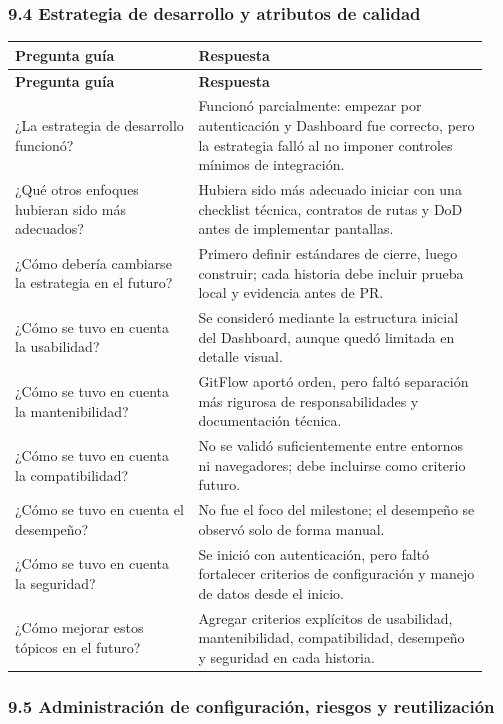 \documentclass[11pt,a4paper]{article}
\begin{document}
\subsubsection{9.4 Estrategia de desarrollo y atributos de calidad}

\begingroup
\small
\setlength{\tabcolsep}{3pt}
\begin{longtable}{P{0.36\linewidth}P{0.58\linewidth}}
\toprule
\textbf{Pregunta guía} & \textbf{Respuesta} \\
\midrule
\endfirsthead
\toprule
\textbf{Pregunta guía} & \textbf{Respuesta} \\
\midrule
\endhead
\bottomrule
\endlastfoot
¿La estrategia de desarrollo funcionó? & Funcionó parcialmente: empezar por autenticación y Dashboard fue correcto, pero la estrategia falló al no imponer controles mínimos de integración. \\
¿Qué otros enfoques hubieran sido más adecuados? & Hubiera sido más adecuado iniciar con una checklist técnica, contratos de rutas y DoD antes de implementar pantallas. \\
¿Cómo debería cambiarse la estrategia en el futuro? & Primero definir estándares de cierre, luego construir; cada historia debe incluir prueba local y evidencia antes de PR. \\
¿Cómo se tuvo en cuenta la usabilidad? & Se consideró mediante la estructura inicial del Dashboard, aunque quedó limitada en detalle visual. \\
¿Cómo se tuvo en cuenta la mantenibilidad? & GitFlow aportó orden, pero faltó separación más rigurosa de responsabilidades y documentación técnica. \\
¿Cómo se tuvo en cuenta la compatibilidad? & No se validó suficientemente entre entornos ni navegadores; debe incluirse como criterio futuro. \\
¿Cómo se tuvo en cuenta el desempeño? & No fue el foco del milestone; el desempeño se observó solo de forma manual. \\
¿Cómo se tuvo en cuenta la seguridad? & Se inició con autenticación, pero faltó fortalecer criterios de configuración y manejo de datos desde el inicio. \\
¿Cómo mejorar estos tópicos en el futuro? & Agregar criterios explícitos de usabilidad, mantenibilidad, compatibilidad, desempeño y seguridad en cada historia. \\
\end{longtable}
\endgroup

\subsubsection{9.5 Administración de configuración, riesgos y reutilización}
\end{document}
